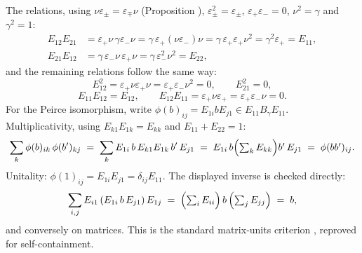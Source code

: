 The relations, using $\nu \varepsilon_\pm = \varepsilon_\mp \nu$ (Proposition ), $\varepsilon_\pm^2 = \varepsilon_\pm$, $\varepsilon_+\varepsilon_- = 0$, $\nu^2 = \gamma$ and $\gamma^2 = 1$:
\begin{align*}
E_{12}E_{21} &= \varepsilon_+ \nu\, \gamma \varepsilon_- \nu = \gamma\, \varepsilon_+ (\nu \varepsilon_-) \nu = \gamma\, \varepsilon_+ \varepsilon_+ \nu^2 = \gamma^2 \varepsilon_+ = E_{11},\\
E_{21}E_{12} &= \gamma\, \varepsilon_- \nu\, \varepsilon_+ \nu = \gamma\, \varepsilon_-^2 \nu^2 = E_{22},
\end{align*}
and the remaining relations follow the same way:
\[
E_{12}^2 = \varepsilon_+ \nu \varepsilon_+ \nu = \varepsilon_+ \varepsilon_- \nu^2 = 0, \qquad E_{21}^2 = 0,
\]
\[
E_{11}E_{12} = E_{12}, \qquad
E_{12}E_{11} = \varepsilon_+ \nu \varepsilon_+ = \varepsilon_+\varepsilon_-\nu = 0 .
\] For the Peirce isomorphism, write $\phi(b)_{ij} = E_{1i} b E_{j1} \in E_{11} B_\gamma E_{11}$. Multiplicativity, using $E_{k1}E_{1k} = E_{kk}$ and $E_{11} + E_{22} = 1$:
\[
\sum_k \phi(b)_{ik}\,\phi(b')_{kj}
\;=\; \sum_k E_{1i}\, b\, E_{k1}E_{1k}\, b'\, E_{j1}
\;=\; E_{1i}\, b \Bigl(\textstyle\sum_k E_{kk}\Bigr) b'\, E_{j1}
\;=\; \phi(bb')_{ij} .
\]
Unitality: $\phi(1)_{ij} = E_{1i}E_{j1} = \delta_{ij} E_{11}$. The displayed inverse is checked directly:
\[
\sum_{i,j} E_{i1}\, (E_{1i}\, b\, E_{j1})\, E_{1j} \;=\; \Bigl(\textstyle\sum_i E_{ii}\Bigr)\, b\, \Bigl(\textstyle\sum_j E_{jj}\Bigr) \;=\; b ,
\]
and conversely on matrices. This is the standard matrix-units criterion \cite{LamFC2001}, reproved for self-containment.
